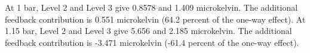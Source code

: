 At 1 bar, Level 2 and Level 3 give 0.8578 and 1.409 microkelvin. The additional feedback contribution is 0.551 microkelvin (64.2 percent of the one-way effect). At 1.15 bar, Level 2 and Level 3 give 5.656 and 2.185 microkelvin. The additional feedback contribution is -3.471 microkelvin (-61.4 percent of the one-way effect).
